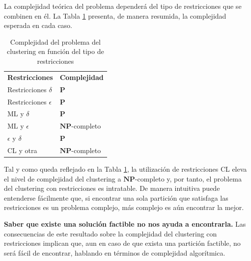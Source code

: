 La complejidad teórica del problema dependerá del tipo de restricciones que se combinen en él. La Tabla \ref{tab:tabla1} presenta, de manera resumida, la complejidad esperada en cada caso. 

\begin{table}[h]
	\centering
	\setlength{\arrayrulewidth}{1mm}
	\setlength{\tabcolsep}{10pt}
	\renewcommand{\arraystretch}{1}
	
	\begin{tabular}{ >{\centering\arraybackslash}m{4cm}  >{\centering\arraybackslash}m{4cm} }
		\hline
		\rowcolor{black}
		\multicolumn{2}{c}{\bf \color{white}{Complejidad del clustering con restricciones}}\\
		\hline
		\rowcolor{gray!50}
		\textbf{Restricciones} & \textbf{Complejidad} \\
		Restricciones $\delta$ & $\mathbf{P}$ \\
		Restricciones $\epsilon$ & $\mathbf{P}$ \\
		\acs{ML} y $\delta$ & $\mathbf{P}$ \\
		\acs{ML} y $\epsilon$ & $\mathbf{NP}$-completo \\
		$\epsilon$ y $\delta$ & $\mathbf{P}$ \\
		\acs{CL} y otra & $\mathbf{NP}$-completo \\
		\hline
		
	\end{tabular}
	\caption[Complejidad del problema del clustering en función del tipo de restricciones]{Complejidad del problema del clustering en función del tipo de restricciones \cite{Survey:2007}}
	\label{tab:tabla1}
\end{table}

Tal y como queda reflejado en la Tabla \ref{tab:tabla1}, la utilización de restricciones \acf{CL} eleva el nivel de complejidad del clustering a $\mathbf{NP}$-completo y, por tanto, el problema del clustering con restricciones es intratable. De manera intuitiva puede entenderse fácilmente que, si encontrar una sola partición que satisfaga las restricciones es un problema complejo, más complejo es aún encontrar la mejor. 

\begin{observacion}
	
	\textbf{Saber que existe una solución factible no nos ayuda a encontrarla.} Las consecuencias de este resultado sobre la complejidad del clustering con restricciones implican que, aun en caso de que exista una partición factible, no será fácil de encontrar, hablando en términos de complejidad algorítmica. \cite{Survey:2007}
	\label{ob:observacion34}
	
\end{observacion} 

